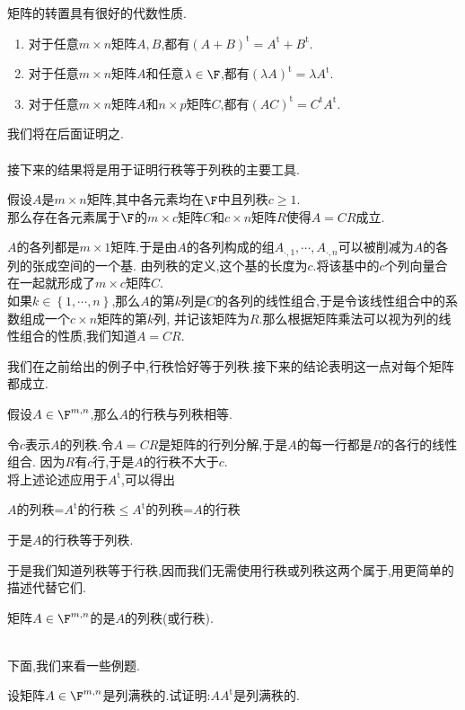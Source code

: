 \documentclass{ctexart}
\begin{document}
矩阵的转置具有很好的代数性质.
\begin{formal}[2.2 转置矩阵的代数性质]
    \begin{enumerate}[label=\tbf{(\arabic*)}]
        \item 对于任意$m\times n$矩阵$A,B$,都有$(A+B)^{\text{t}}=A^\text{t}+B^\text{t}$.
        \item 对于任意$m\times n$矩阵$A$和任意$\lambda\in\F$,都有$(\lambda A)^\text{t}=\lambda A^\text{t}$.
        \item 对于任意$m\times n$矩阵$A$和$n\times p$矩阵$C$,都有$(AC)^\text{t}=C^\text{t}A^\text{t}$.
    \end{enumerate}
\end{formal}\noindent
我们将在后面证明之.\\
\\
接下来的结果将是用于证明行秩等于列秩的主要工具.
\begin{formal}[3.1 行列分解]
    假设$A$是$m\times n$矩阵,其中各元素均在$\F$中且列秩$c\geqslant 1$.\\
    那么存在各元素属于$\F$的$m\times c$矩阵$C$和$c\times n$矩阵$R$使得$A=CR$成立.
\end{formal}
\begin{solution}[Proof.]
    $A$的各列都是$m\times 1$矩阵.于是由$A$的各列构成的组$A_{\cdot,1},\cdots,A_{\cdot,n}$可以被削减为$A$的各列的张成空间的一个基.
    由列秩的定义,这个基的长度为$c$.将该基中的$c$个列向量合在一起就形成了$m\times c$矩阵$C$.\\
    如果$k\in\left\{1,\cdots,n\right\}$,那么$A$的第$k$列是$C$的各列的线性组合,于是令该线性组合中的系数组成一个$c\times n$矩阵的第$k$列,
    并记该矩阵为$R$.那么根据矩阵乘法可以视为列的线性组合的性质,我们知道$A=CR$.
\end{solution}\noindent
我们在之前给出的例子中,行秩恰好等于列秩.接下来的结论表明这一点对每个矩阵都成立.
\begin{formal}[3.2 列秩等于行秩]
    假设$A\in\F^{m,n}$,那么$A$的行秩与列秩相等.
\end{formal}
\begin{solution}[Proof.]
    令$c$表示$A$的列秩.令$A=CR$是矩阵的行列分解,于是$A$的每一行都是$R$的各行的线性组合.
    因为$R$有$c$行,于是$A$的行秩不大于$c$.\\
    将上述论述应用于$A^{\text{t}}$,可以得出
    \begin{center}$A$的列秩=$A^{\text{t}}$的行秩$\leqslant$$A^{\text{t}}$的列秩=$A$的行秩\end{center}
    于是$A$的行秩等于列秩.
\end{solution}\noindent
于是我们知道列秩等于行秩,因而我们无需使用行秩或列秩这两个属于,用更简单的描述代替它们.
\begin{definition}[3.3 定义:秩]
    矩阵$A\in\F^{m,n}$的是$A$的列秩(或行秩).
\end{definition}\ \\
下面,我们来看一些例题.
\begin{problem}[Example 1.]
    设矩阵$A\in\F^{m,n}$是列满秩的.试证明:$AA^{\text{t}}$是列满秩的. 
\end{problem}
\end{document}
